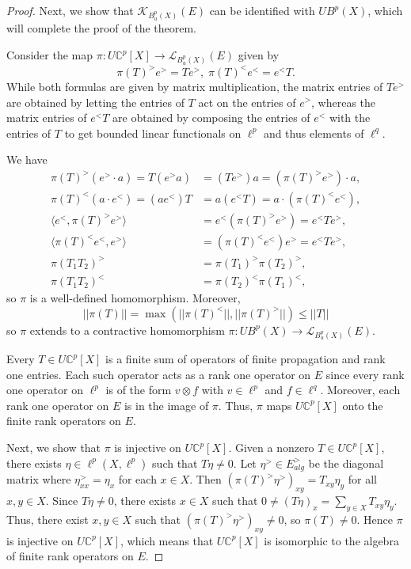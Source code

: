\documentclass[a4,11pt]{amsart}
\theoremstyle{remark}
\begin{document}
\begin{proof}
Next, we show that $\mathcal{K}_{B^p_u(X)}(E)$ can be identified with $UB^p(X)$, which will complete the proof of the theorem.

Consider the map $\pi:U\mathbb{C}^p[X]\rightarrow\mathcal{L}_{B^p_u(X)}(E)$ given by
\[ \pi(T)^>e^>=Te^>,\; \pi(T)^<e^<=e^<T. \] 
While both formulas are given by matrix multiplication, the matrix entries of $Te^>$ are obtained by letting the entries of $T$ act on the entries of $e^>$, whereas the matrix entries of $e^<T$ are obtained by composing the entries of $e^<$ with the entries of $T$ to get bounded linear functionals on $\ell^p$ and thus elements of $\ell^q$.

We have 
\begin{align*}
\pi(T)^>(e^>\cdot a)=T(e^>a)&=(Te^>)a=(\pi(T)^>e^>)\cdot a, \\
\pi(T)^<(a\cdot e^<)=(ae^<)T&=a(e^<T)=a\cdot(\pi(T)^<e^<), \\
\langle e^<,\pi(T)^>e^> \rangle &= e^<(\pi(T)^>e^>)=e^<Te^>, \\
\langle \pi(T)^<e^<,e^> \rangle &=(\pi(T)^<e^<)e^>=e^<Te^>, \\
\pi(T_1T_2)^> &= \pi(T_1)^>\pi(T_2)^>, \\
\pi(T_1T_2)^< &= \pi(T_2)^<\pi(T_1)^<,
\end{align*}
so $\pi$ is a well-defined homomorphism.
Moreover, \[ ||\pi(T)||=\max(||\pi(T)^<||,||\pi(T)^>||)\leq||T|| \] 
so $\pi$ extends to a contractive homomorphism $\pi:UB^p(X)\rightarrow\mathcal{L}_{B^p_u(X)}(E)$.

Every $T\in U\mathbb{C}^p[X]$ is a finite sum of operators of finite propagation and rank one entries. Each such operator acts as a rank one operator on $E$ since every rank one operator on $\ell^p$ is of the form $v\otimes f$ with $v\in\ell^p$ and $f\in\ell^q$.
Moreover, each rank one operator on $E$ is in the image of $\pi$.
Thus, $\pi$ maps $U\mathbb{C}^p[X]$ onto the finite rank operators on $E$.

Next, we show that $\pi$ is injective on $U\mathbb{C}^p[X]$.
Given a nonzero $T\in U\mathbb{C}^p[X]$, there exists $\eta\in\ell^p(X,\ell^p)$ such that $T\eta\neq 0$. 
Let $\eta^>\in E^>_{alg}$ be the diagonal matrix where $\eta^>_{xx}=\eta_x$ for each $x\in X$.
Then $(\pi(T)^>\eta^>)_{xy}=T_{xy}\eta_y$ for all $x,y\in X$.
Since $T\eta\neq 0$, there exists $x\in X$ such that $0\neq (T\eta)_x=\sum_{y\in X}T_{xy}\eta_y$.
Thus, there exist $x,y\in X$ such that $(\pi(T)^>\eta^>)_{xy}\neq 0$, so $\pi(T)\neq 0$.
Hence $\pi$ is injective on $U\mathbb{C}^p[X]$, which means that $U\mathbb{C}^p[X]$ is isomorphic to the algebra of finite rank operators on $E$.


\end{proof}
\end{document}
